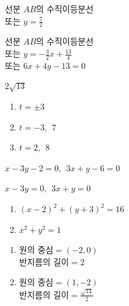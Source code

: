 \documentclass{oblivoir}
\begin{document}
\begin{minipage}[t]{.49\textwidth}
%
선분 \(AB\)의 수직이등분선 \\또는 \(y=\frac72\)

%
선분 \(AB\)의 수직이등분선 \\또는 \(y=-\frac32x+\frac{13}4\) \\또는 \(6x+4y-13=0\)

%
\(2\sqrt{13}\)

%
\begin{enumerate}
\item
\(t=\pm3\)
\item
\(t=-3,\:\:7\)
\item
\(t=2,\:\:8\)
\end{enumerate}

%
\(x-3y-2=0,\:\:3x+y-6=0\)

%
\(x-3y=0,\:\:3x+y=0\)

\end{minipage}
\begin{minipage}[t]{.49\textwidth}

%
\begin{enumerate}
\item
\((x-2)^2+(y+3)^2=16\)
\item
\(x^2+y^2=1\)
\end{enumerate}

%
\begin{enumerate}
\item
\(\text{원의 중심}=(-2,0)\)\\ \(\text{반지름의 길이}=2\)
\item
\(\text{원의 중심}=(1,-2)\)\\ \(\text{반지름의 길이}=\frac{\sqrt{14}}2\)
\end{enumerate}
\end{minipage}
\end{document}
